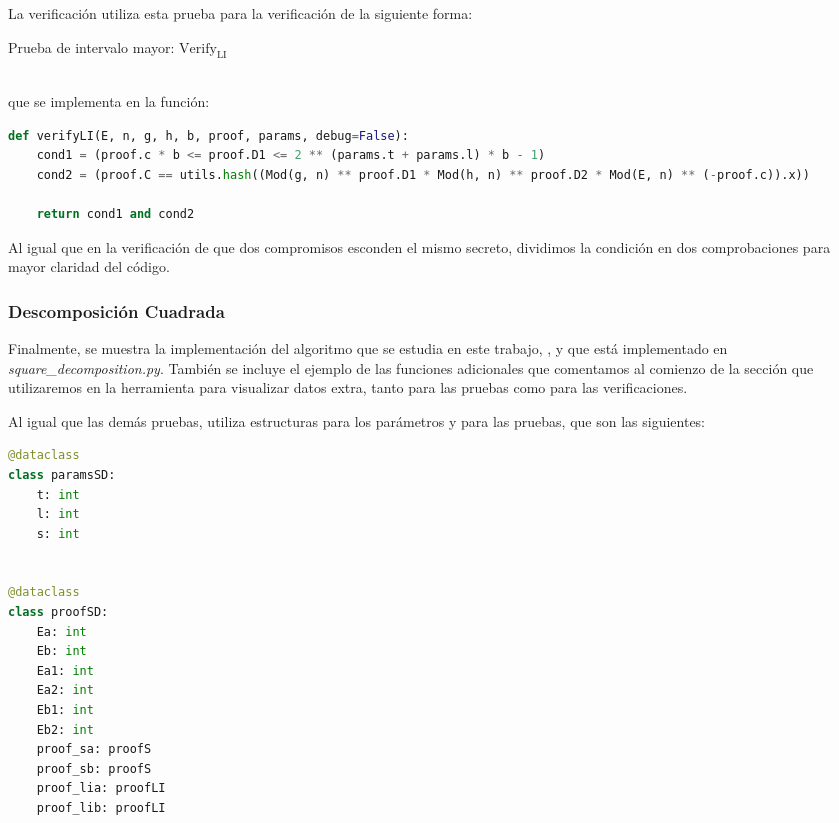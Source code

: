 La verificación utiliza esta prueba para la verificación de la siguiente forma: \\
\begin{minipage}{0.9\textwidth}
    \begin{algorithm}[H]
        \caption{Prueba de intervalo mayor: $\operatorname{Verify_{LI}}$}
         
    \end{algorithm}
\end{minipage} \\
que se implementa en la función:
\begin{lstlisting}[language=Python, basicstyle=\footnotesize]
def verifyLI(E, n, g, h, b, proof, params, debug=False):
    cond1 = (proof.c * b <= proof.D1 <= 2 ** (params.t + params.l) * b - 1)
    cond2 = (proof.C == utils.hash((Mod(g, n) ** proof.D1 * Mod(h, n) ** proof.D2 * Mod(E, n) ** (-proof.c)).x))

    return cond1 and cond2
\end{lstlisting}
Al igual que en la verificación de que dos compromisos esconden el mismo secreto, dividimos la condición en dos comprobaciones para mayor claridad del código.

\subsubsection{Descomposición Cuadrada}

Finalmente, se muestra la implementación del algoritmo que se estudia en este trabajo, , y que está implementado en \emph{square\_decomposition.py}. También se incluye el ejemplo de las funciones adicionales que comentamos al comienzo de la sección que utilizaremos en la herramienta para visualizar datos extra, tanto para las pruebas como para las verificaciones.

Al igual que las demás pruebas, utiliza estructuras para los parámetros y para las pruebas, que son las siguientes:
\begin{lstlisting}[language=Python, basicstyle=\footnotesize]
@dataclass
class paramsSD:
    t: int
    l: int
    s: int


@dataclass
class proofSD:
    Ea: int
    Eb: int
    Ea1: int
    Ea2: int
    Eb1: int
    Eb2: int
    proof_sa: proofS
    proof_sb: proofS
    proof_lia: proofLI
    proof_lib: proofLI
\end{lstlisting}

